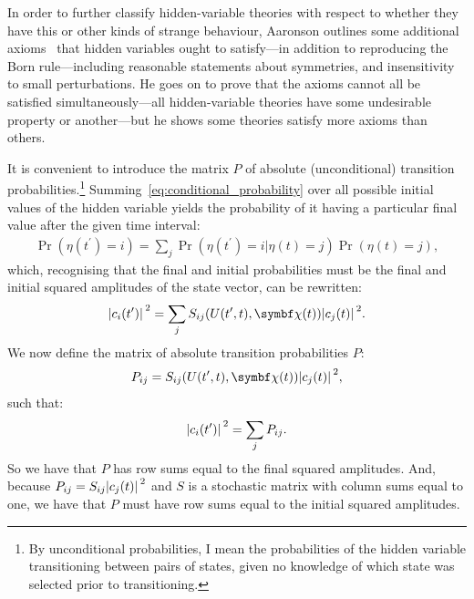 In order to further classify hidden-variable theories with respect to whether they have this or other kinds of strange behaviour, Aaronson outlines some additional axioms~\cite{PhysRevA.71.032325} that hidden variables ought to satisfy---in addition to reproducing the Born rule---including reasonable statements about symmetries, and insensitivity to small perturbations. He goes on to prove that the axioms cannot all be satisfied simultaneously---all hidden-variable theories have some undesirable property or another---but he shows some theories satisfy more axioms than others.

It is convenient to introduce the matrix $P$ of absolute (unconditional) transition probabilities.\footnote{By unconditional probabilities, I mean the probabilities of the hidden variable transitioning between pairs of states, given no knowledge of which state was selected prior to transitioning.} Summing~\eqref{eq:conditional_probability} over all possible initial values of the hidden variable yields the probability of it having a particular final value after the given time interval:
\begin{align}
\Pr(\eta(t^\prime){=}i) 
= \sum_j \Pr(\eta(t^\prime){=}i|\eta(t){=}j) \Pr(\eta(t){=}j),
\end{align}
which, recognising that the final and initial probabilities must be the final and initial squared amplitudes of the state vector, can be rewritten:
\begin{align}
\abs{c_i(t^\prime)}^2
= \sum_j S_{ij}(U(t^\prime, t), \vec\chi(t)) \abs{c_j(t)}^2.
\end{align}
We now define the matrix of absolute transition probabilities $P$:
\begin{align}\label{eq:P_matrix_def}
P_{ij} = S_{ij}(U(t^\prime, t), \vec\chi(t)) \abs{c_j(t)}^2,
\end{align}
such that:
\begin{align}
\abs{c_i(t^\prime)}^2
= \sum_j P_{ij}.
\end{align}
So we have that $P$ has row sums equal to the final squared amplitudes.
And, because $P_{ij} = S_{ij}\abs{c_j(t)}^2$ and $S$ is a stochastic matrix with column sums equal to one, we have that $P$ must have row sums equal to the initial squared amplitudes.

